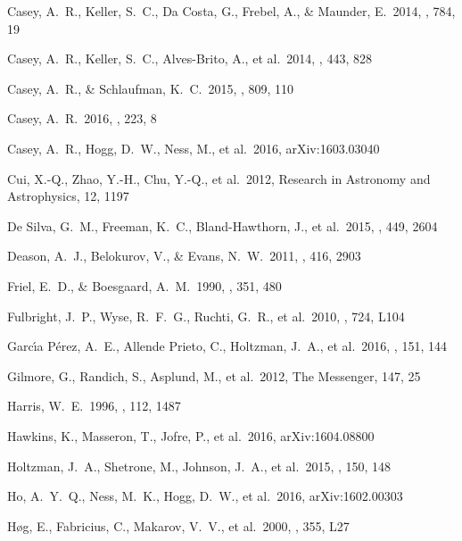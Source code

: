 \documentclass[preprint]{aastex}
\begin{document}
\begin{thebibliography}{dummy}
 Casey, A.~R., Keller, S.~C., Da Costa, G., Frebel, A., \& Maunder, E.\ 2014, \apj, 784, 19 

 Casey, A.~R., Keller, S.~C., Alves-Brito, A., et al.\ 2014, \mnras, 443, 828 

 Casey, A.~R., \& Schlaufman, K.~C.\ 2015, \apj, 809, 110 

 Casey, A.~R.\ 2016, \apjs, 223, 8 

 Casey, A.~R., Hogg, D.~W., Ness, M., et al.\ 2016, arXiv:1603.03040 

 Cui, X.-Q., Zhao, Y.-H., Chu, Y.-Q., et al.\ 2012, Research in Astronomy and Astrophysics, 12, 1197 

 De Silva, G.~M., Freeman, K.~C., Bland-Hawthorn, J., et al.\ 2015, \mnras, 449, 2604 

 Deason, A.~J., Belokurov, V., \& Evans, N.~W.\ 2011, \mnras, 416, 2903 

 Friel, E.~D., \& Boesgaard, A.~M.\ 1990, \apj, 351, 480 

 Fulbright, J.~P., Wyse, R.~F.~G., Ruchti, G.~R., et al.\ 2010, \apjl, 724, L104 

 Garc{\'{\i}}a P{\'e}rez, A.~E., Allende Prieto, C., Holtzman, J.~A., et al.\ 2016, \aj, 151, 144 

 Gilmore, G., Randich, S., Asplund, M., et al.\ 2012, The Messenger, 147, 25

 Harris, W.~E.\ 1996, \aj, 112, 1487 

 Hawkins, K., Masseron, T., Jofre, P., et al.\ 2016, arXiv:1604.08800 

 Holtzman, J.~A., Shetrone, M., Johnson, J.~A., et al.\ 2015, \aj, 150, 148 

 Ho, A.~Y.~Q., Ness, M.~K., Hogg, D.~W., et al.\ 2016, arXiv:1602.00303 
 
 H{\o}g, E., Fabricius, C., Makarov, V.~V., et al.\ 2000, \aap, 355, L27 


\end{thebibliography}
\end{document}
